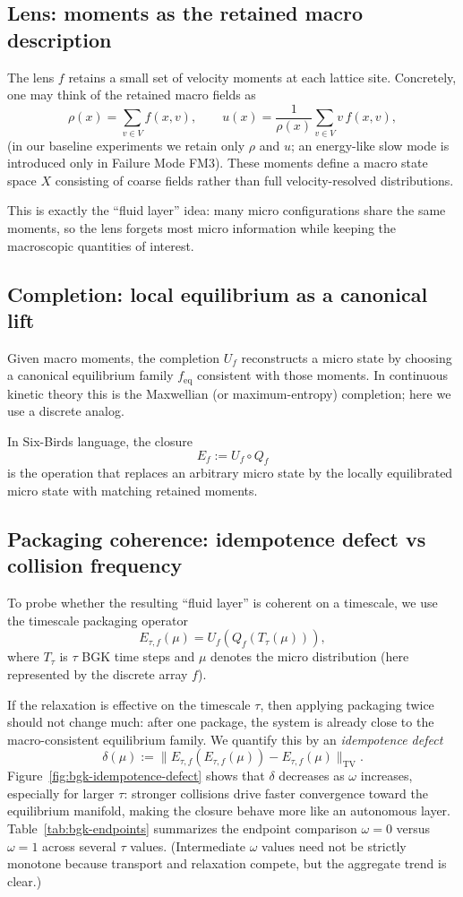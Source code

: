 \documentclass[11pt]{article}
\providecommand{\X}{X}
\providecommand{\Lens}{f}
\providecommand{\Qf}{Q_f}
\providecommand{\Uf}{U_f}
\providecommand{\Etauf}{E_{\tau,f}}
\providecommand{\TVnorm}[1]{\lVert #1\rVert_{\mathrm{TV}}}
\begin{document}
\subsection{Lens: moments as the retained macro description}
The lens $\Lens$ retains a small set of velocity moments at each lattice site. Concretely, one may think of the retained macro fields as
\[
  \rho(x) = \sum_{v\in V} f(x,v),
  \qquad
  u(x) = \frac{1}{\rho(x)}\sum_{v\in V} v\,f(x,v),
\]
(in our baseline experiments we retain only $\rho$ and $u$; an energy-like slow mode is introduced only in Failure Mode FM3). These moments define a macro state space $\X$ consisting of coarse fields rather than full velocity-resolved distributions.

This is exactly the ``fluid layer'' idea: many micro configurations share the same moments, so the lens forgets most micro information while keeping the macroscopic quantities of interest.

\subsection{Completion: local equilibrium as a canonical lift}
Given macro moments, the completion $\Uf$ reconstructs a micro state by choosing a canonical equilibrium family $f_{\mathrm{eq}}$ consistent with those moments. In continuous kinetic theory this is the Maxwellian (or maximum-entropy) completion; here we use a discrete analog.

In Six-Birds language, the closure
\[
  E_f := \Uf\circ\Qf
\]
is the operation that replaces an arbitrary micro state by the locally equilibrated micro state with matching retained moments.

\subsection{Packaging coherence: idempotence defect vs collision frequency}
To probe whether the resulting ``fluid layer'' is coherent on a timescale, we use the timescale packaging operator
\[
  \Etauf(\mu) = \Uf(\Qf(T_\tau(\mu))),
\]
where $T_\tau$ is $\tau$ BGK time steps and $\mu$ denotes the micro distribution (here represented by the discrete array $f$).

If the relaxation is effective on the timescale $\tau$, then applying packaging twice should not change much: after one package, the system is already close to the macro-consistent equilibrium family. We quantify this by an \emph{idempotence defect}
\[
  \delta(\mu) := \TVnorm{\Etauf(\Etauf(\mu)) - \Etauf(\mu)}.
\]
Figure~\ref{fig:bgk-idempotence-defect} shows that $\delta$ decreases as $\omega$ increases, especially for larger $\tau$: stronger collisions drive faster convergence toward the equilibrium manifold, making the closure behave more like an autonomous layer. Table~\ref{tab:bgk-endpoints} summarizes the endpoint comparison $\omega=0$ versus $\omega=1$ across several $\tau$ values. (Intermediate $\omega$ values need not be strictly monotone because transport and relaxation compete, but the aggregate trend is clear.)
\end{document}
